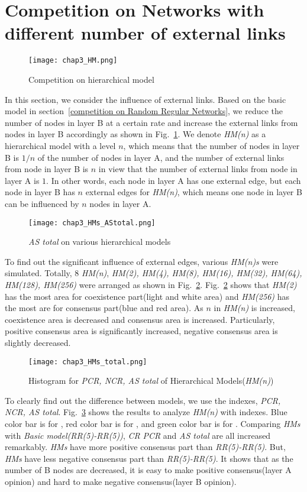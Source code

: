 \section{Competition on Networks with different number of external links}
\begin{figure}[!htb]
	\centering
	\texttt{[image: chap3\_HM.png]}
	\caption{Competition on hierarchical model}
	\label{chap3_HM}
\end{figure}
In this section, we consider the influence of external links. Based on the basic model in section~\ref{competition on Random Regular Networks}, we reduce the number of nodes in layer B at a certain rate and increase the external links from nodes in layer B accordingly as shown in Fig.~\ref{chap3_HM}.  We denote \textit{HM(n)} as a hierarchical model with a level $n$, which means that the number of nodes in layer B is $1/n$ of the number of nodes in layer A, and the number of external links from node in layer B is $n$ in view that the number of external links from node in layer A is $1$. In other words, each node in layer A has one external edge, but each node in layer B has $n$ external edges for \textit{HM(n)}, which means one node in layer B can be influenced by $n$ nodes in layer A.
\begin{figure}[!htb]
	\centering
	\texttt{[image: chap3\_HMs\_AStotal.png]}
	\caption{\textit{AS total} on various hierarchical models}
	\label{chap3_HMs_AStotal}
\end{figure}
To find out the significant influence of external edges, various \textit{HM(n)s} were simulated.  Totally, $8$ \textit{HM(n)}, \textit{HM(2), HM(4), HM(8), HM(16), HM(32), HM(64), HM(128), HM(256)} were arranged as shown in Fig.~\ref{chap3_HMs_AStotal}.  
Fig.~\ref{chap3_HMs_AStotal} shows that \textit{HM(2)} has the most area for coexistence part(light and white area) and \textit{HM(256)} has the most are for consensus part(blue and red area). As $n$ in \textit{HM(n)} is increased, coexistence area is decreased and consensus area is increased. Particularly, positive consensus area is significantly increased, negative consensus area is slightly decreased.  
\begin{figure}[!htb]
	\centering
	\texttt{[image: chap3\_HMs\_total.png]}
	\caption{Histogram for \textit{PCR, NCR, AS total} of Hierarchical Models(\textit{HM(n)})}
	\label{chap3_HMs_total}
\end{figure}
To clearly find out the difference between models, we use the indexes, \textit{PCR, NCR, AS total}. Fig.~\ref{chap3_HMs_total} shows the results to analyze \textit{HM(n)} with indexes. Blue color bar is for , red color bar is for , and green color bar is for . Comparing \textit{HMs} with \textit{Basic model(RR(5)-RR(5))}, \textit{CR} \textit{PCR} and \textit{AS total} are all increased remarkably. \textit{HMs} have more positive consensus part than \textit{RR(5)-RR(5)}. But, \textit{HMs} have less negative consensus part than \textit{RR(5)-RR(5)}. It shows that as the number of B nodes are decreased, it is easy to make positive consensus(layer A opinion) and hard to make negative consensus(layer B opinion).  

